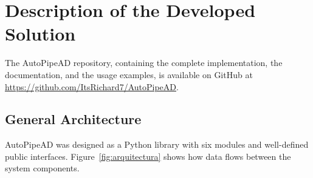 \documentclass[conference]{IEEEtran}
\begin{document}
\section{Description of the Developed Solution}

The AutoPipeAD repository, containing the complete implementation, the
documentation, and the usage examples, is available on GitHub at
\url{https://github.com/ItsRichard7/AutoPipeAD}.

\subsection{General Architecture}

AutoPipeAD was designed as a Python library with six modules and well-defined
public interfaces. Figure~\ref{fig:arquitectura} shows how data flows between
the system components.
\end{document}
